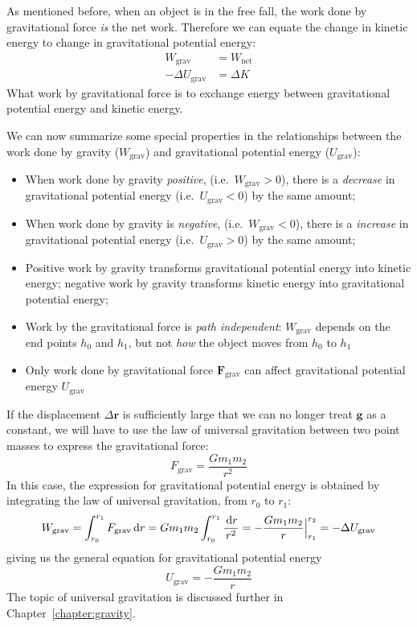 As mentioned before, when an object is in the free fall, the work done by
gravitational force \emph{is} the net work. Therefore we can equate the change
in kinetic energy to change in gravitational potential energy:
\begin{align*}
  W_\text{grav}&=W_\text{net}\\
  -\Delta U_\text{grav} &= \Delta K
\end{align*}
What work by gravitational force is to exchange energy between gravitational
potential energy and kinetic energy.

We can now summarize some special properties in the relationships between the
work done by gravity ($W_\text{grav}$) and gravitational potential energy
($U_\text{grav}$):

\begin{definition}
  \begin{itemize}[itemsep=6pt]
  \item When work done by gravity \emph{positive}, (i.e.\ $W_\text{grav}>0$),
    there is a \emph{decrease} in gravitational potential energy (i.e.\
    $U_\text{grav}<0$) by the same amount;
  \item When work done by gravity is \emph{negative}, (i.e.\ $W_\text{grav}<0$),
    there is a \emph{increase} in gravitational potential energy (i.e.\
    $U_\text{grav}>0$) by the same amount;
  \item Positive work by gravity transforms gravitational potential energy into
    kinetic energy; negative work by gravity transforms kinetic energy into
    gravitational potential energy;
  \item Work by the gravitational force is \emph{path independent}:
    $W_\text{grav}$ depends on the end points $h_0$ and $h_1$, but not
    \emph{how} the object moves from $h_0$ to $h_1$
  \item Only work done by gravitational force $\bm F_\text{grav}$ can affect
    gravitational potential energy $U_\text{grav}$
  \end{itemize}
\end{definition}
If the displacement $\Delta\bm r$ is sufficiently large that we can no longer
treat $\bm g$ as a constant, we will have to use the law of universal
gravitation between two point masses to express the gravitational force:
\begin{equation*}
  F_\text{grav}=\frac{Gm_1m_2}{r^2}
\end{equation*}
In this case, the expression for gravitational potential energy is obtained by
integrating the law of universal gravitation, from $r_0$ to $r_1$:
\begin{equation*}
  W_\text{grav}
  =\int_{r_0}^{r_1} F_\text{grav}\dl r
  = Gm_1m_2\int_{r_0}^{r_1}\frac{\dl r}{r^2}
  =-\frac{Gm_1m_2} r\Big|^{r_2}_{r_1}=-\Delta U_\text{grav}
\end{equation*}
giving us the general equation for gravitational potential energy
\begin{equation*}
  U_\text{grav}=-\frac{Gm_1m_2}r
\end{equation*}
The topic of universal gravitation is discussed further in
Chapter~\ref{chapter:gravity}.




